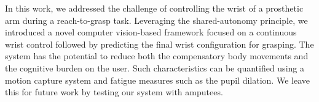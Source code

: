 In this work, we addressed the challenge of controlling the wrist of a prosthetic arm during a reach-to-grasp task. Leveraging the shared-autonomy principle, we introduced a novel computer vision-based framework focused on a continuous wrist control followed by predicting the final wrist configuration for grasping. The system has the potential to reduce both the compensatory body movements and the cognitive burden on the user. Such characteristics can be quantified using a motion capture system and fatigue measures such as the pupil dilation. We leave this for future work by testing our system with amputees.

